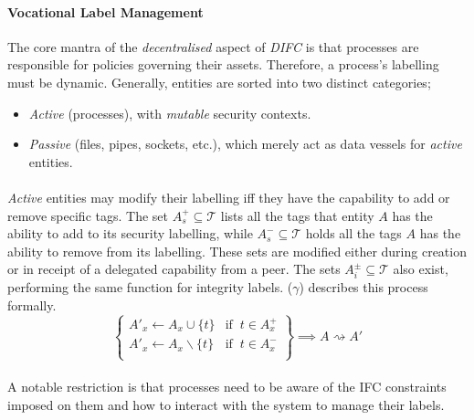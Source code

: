 \paragraph{Vocational Label Management} The core mantra of the \textit{decentralised} aspect of \textit{DIFC} is that processes are responsible for policies governing their assets. Therefore, a process's labelling must be dynamic. Generally, entities are sorted into two distinct categories;

\begin{itemize}
    \item \textit{Active} (processes), with \textit{mutable} security contexts.
    \item \textit{Passive} (files, pipes, sockets, etc.), which merely act as data vessels for \textit{active} entities.
\end{itemize}

\paragraph{} \textit{Active} entities may modify their labelling iff they have the capability to add or remove specific tags. The set $A_{s}^{+} \subseteq \mathcal{T}$ lists all the tags that entity $A$ has the ability to add to its security labelling, while $A_{s}^{-} \subseteq \mathcal{T}$ holds all the tags $A$ has the ability to remove from its labelling. These sets are modified either during creation or in receipt of a delegated capability from a peer. The sets $A_{i}^{\pm} \subseteq \mathcal{T}$ also exist, performing the same function for integrity labels. ($\gamma$) describes this process formally.
\begin{equation}
    \left\{\begin{array}{lr}
        A'_x \leftarrow A_x \cup \{t\} & \text{if} \;\; t \in A_{x}^{+} \\
        A'_x \leftarrow A_x \smallsetminus \{t\} & \text{if} \;\; t \in A_{x}^{-} \\
    \end{array}\right\} \implies A \rightsquigarrow A' \tag{$\gamma$}
\end{equation}

\paragraph{} A notable restriction is that processes need to be aware of the IFC constraints imposed on them and how to interact with the system to manage their labels.

